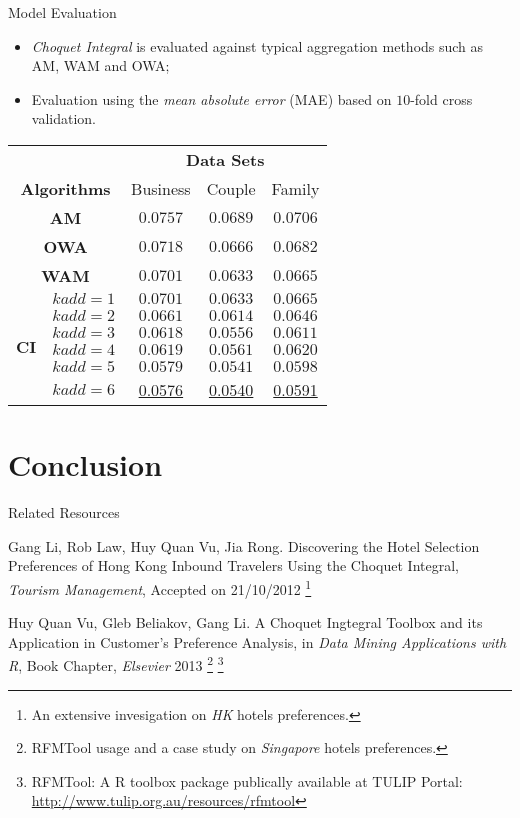 \documentclass[
 size=12pt,
 paper=smartboard,  %
 mode=present, 		%
 display=slides, 	%
 style=tuliplab,  	%
 pauseslide,
 fleqn,leqno]{powerdot}
\begin{document}
\begin{slide}[toc=,bm=]{Model Evaluation}
\begin{itemize}
 \item<1-> \emph{Choquet Integral} is evaluated against typical aggregation methods such as AM, WAM and OWA;
 \item<2-> Evaluation using the \emph{mean absolute  error} (MAE) based on $10$-fold cross validation.
\end{itemize}
{ \footnotesize \centering
\begin{tabular}{c c c c c}
\toprule
&   &\multicolumn{3}{c}{\textbf{Data Sets}}\\
\multicolumn{2}{c}{\textbf{Algorithms}}   & Business  & Couple & Family     \\
\midrule
\multicolumn{2}{c}{\textbf{AM}}    &$0.0757$ & $0.0689$& $0.0706$ \\
\multicolumn{2}{c}{\textbf{OWA}}     &$0.0718$ & $0.0666$& $0.0682$ \\
\multicolumn{2}{c}{\textbf{WAM}}    &$0.0701$ & $0.0633$& $0.0665$ \\
\midrule
\multirow{6}{*}{\textbf{CI}}
& $kadd = 1$ &     $0.0701$ & $0.0633$& $0.0665$ \\
& $kadd = 2$ &    $0.0661$ & $0.0614$& $0.0646$ \\
& $kadd = 3$ &     $0.0618$ & $0.0556$& $0.0611$ \\
& $kadd = 4$ &     $0.0619$ & $0.0561$& $0.0620$ \\
& $kadd = 5$ &     $0.0579$ & $0.0541$& $0.0598$ \\
& $kadd = 6$ &     \underline{0.0576} & \underline{0.0540}& \underline{0.0591} \\
\bottomrule
\end{tabular}
}
\end{slide}

\section{Conclusion}


\begin{slide}[toc=,bm=]{Related Resources}
\begin{thebibliography}{1}
 Gang Li, Rob Law, Huy Quan Vu, Jia Rong. 
Discovering the Hotel Selection Preferences of Hong Kong Inbound Travelers Using the Choquet Integral, 
\emph{Tourism Management}, Accepted on 21/10/2012
\footnote{An extensive invesigation on \emph{HK} hotels preferences.}

 Huy Quan Vu, Gleb Beliakov, Gang Li. 
A Choquet Ingtegral Toolbox and its Application in Customer's Preference Analysis, 
in \emph{Data Mining Applications with R}, Book Chapter, \emph{Elsevier} 2013
\footnote{RFMTool usage and a case study on \emph{Singapore} hotels preferences.}
\footnote{RFMTool: A R toolbox package publically available at TULIP Portal: \url{http://www.tulip.org.au/resources/rfmtool}}
\end{thebibliography}
\end{slide}
\end{document}
